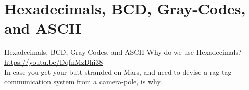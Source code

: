 \documentclass{beamer}
\begin{document}
%
%

\section{Hexadecimals, BCD, Gray-Codes, and ASCII}

\begin{frame}{Hexadecimals, BCD, Gray-Codes, and ASCII}
Why do we use Hexadecimals? \\ \vspace{0.5cm}
\url{https://youtu.be/DqfnMzDhi38} \\
In case you get your butt stranded on Mars, and need to devise a rag-tag communication system from a camera-pole, is why.
\end{frame}
\end{document}
